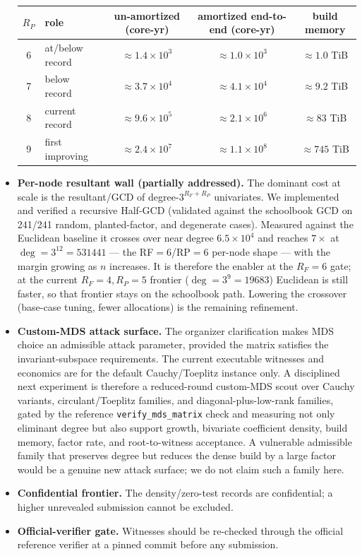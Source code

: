 \documentclass[11pt]{article}
\newcommand{\RF}{R_F}
\newcommand{\RP}{R_P}
\newcommand{\Verified}[1]{}
\newcommand{\Verified}[1]{\marginpar{\footnotesize\textcolor{blue}{[V: #1]}}}
\theoremstyle{plain}
\begin{document}
\begin{itemize}
\begin{center}
\begin{tabular}{clccc}
\toprule
$\RP$ & role & un-amortized (core-yr) & amortized end-to-end (core-yr) & build memory \\
\midrule
6 & at/below record & $\approx 1.4\times10^3$ & $\approx 1.0\times10^3$ & $\approx 1.0$ TiB \\
7 & below record & $\approx 3.7\times10^4$ & $\approx 4.1\times10^4$ & $\approx 9.2$ TiB \\
8 & current record & $\approx 9.6\times10^5$ & $\approx 2.1\times10^6$ & $\approx 83$ TiB \\
9 & first improving & $\approx 2.4\times10^7$ & $\approx 1.1\times10^8$ & $\approx 745$ TiB \\
\bottomrule
\end{tabular}
\end{center}
\item \textbf{Per-node resultant wall (partially addressed).} The dominant cost at
scale is the resultant/GCD of degree-$3^{\RF+\RP}$ univariates. We implemented and
verified a recursive Half-GCD (validated against the schoolbook GCD on 241/241
random, planted-factor, and degenerate cases). Measured against the Euclidean
baseline it crosses over near degree $6.5\times 10^4$ and reaches $7\times$ at
$\deg = 3^{12} = 531441$ --- the RF$=6$/RP$=6$ per-node shape --- with the margin
growing as $n$ increases. It is therefore the enabler at the $\RF=6$ gate; at the
current $\RF=4,\RP=5$ frontier ($\deg = 3^9 = 19683$) Euclidean is still faster, so
that frontier stays on the schoolbook path. Lowering the crossover (base-case
tuning, fewer allocations) is the remaining refinement. \Verified{hgcd\_bench}
\item \textbf{Custom-MDS attack surface.} The organizer clarification makes MDS
choice an admissible attack parameter, provided the matrix satisfies the
invariant-subspace requirements. The current executable witnesses and economics
are for the default Cauchy/Toeplitz instance only. A disciplined next experiment is
therefore a reduced-round custom-MDS scout over Cauchy variants, circulant/Toeplitz
families, and diagonal-plus-low-rank families, gated by the reference
\texttt{verify\_mds\_matrix} check and measuring not only eliminant degree but also
support growth, bivariate coefficient density, build memory, factor rate, and
root-to-witness acceptance. A vulnerable admissible family that preserves degree
but reduces the dense build by a large factor would be a genuine new attack
surface; we do not claim such a family here.
\item \textbf{Confidential frontier.} The density/zero-test records are confidential;
a higher unrevealed submission cannot be excluded.
\item \textbf{Official-verifier gate.} Witnesses should be re-checked through the
official reference verifier at a pinned commit before any submission.
\end{itemize}
\end{document}
